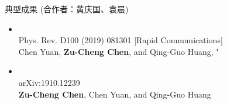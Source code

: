\documentclass[xcolor=dvipsnames]{beamer} %
\begin{document}
%    
\begin{frame}{典型成果 (合作者：黄庆国、袁晨)}    
    \begin{itemize}
        \item {}\\
        Phys. Rev. D100 (2019) 081301 [Rapid Communications]\\
        Chen Yuan, \textbf{Zu-Cheng Chen}, and Qing-Guo Huang, "
        \vspace{2mm}
        
        \item {}\\
        arXiv:1910.12239 \\
        \textbf{Zu-Cheng Chen}, Chen Yuan, and Qing-Guo Huang
    \end{itemize}
\end{frame}
\end{document}
